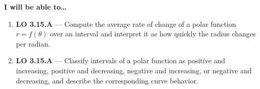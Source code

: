\documentclass[10pt]{article}
\begin{document}
\namedateperiod

\vspace{0.10in}

\begin{objectivebox}
\textbf{I will be able to\ldots}
\begin{enumerate}[leftmargin=1.5em, itemsep=4pt]
  \item \textbf{LO 3.15.A} --- Compute the average rate of change of a polar
    function $r = f(\theta)$ over an interval and interpret it as how quickly
    the radius changes per radian. \writeline
  \item \textbf{LO 3.15.A} --- Classify intervals of a polar function as positive
    and increasing, positive and decreasing, negative and increasing, or negative
    and decreasing, and describe the corresponding curve behavior. \writeline
\end{enumerate}
\end{objectivebox}

\vspace{0.08in}
\end{document}
